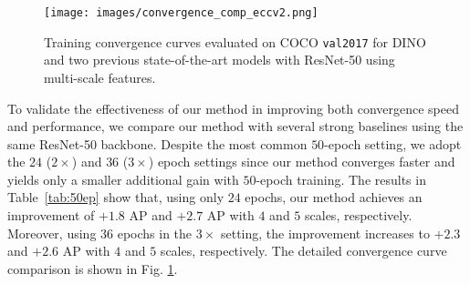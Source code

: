\documentclass[runningheads]{llncs}
\begin{document}
\begin{table}[h]
    \label{tab:50ep}
\end{table} \begin{figure}[h]
\centering
\texttt{[image: images/convergence\_comp\_eccv2.png]}
\caption{Training convergence curves evaluated on COCO \texttt{val2017} for DINO and two previous state-of-the-art models with ResNet-50 using multi-scale features.}
\label{fig:convergence_details}
    \vspace{0.1cm}
\end{figure}
 To validate the effectiveness of our method in improving both convergence speed and performance, we compare our method with several strong baselines using the same ResNet-50 backbone. Despite the most common $50$-epoch setting, we adopt the $24$ ($2\times$) and $36$ ($3\times$) epoch settings since our method converges faster and yields only a smaller additional gain with $50$-epoch training.
The results in Table~\ref{tab:50ep} show that, using only $24$ epochs, our method achieves an improvement of $+1.8$ AP and $+2.7$ AP with $4$ and $5$ scales, respectively. Moreover, using $36$ epochs in the $3\times$ setting, the improvement increases to $+2.3$ and $+2.6$ AP with $4$ and $5$ scales, respectively. The detailed convergence curve comparison is shown in Fig. \ref{fig:convergence_details}.
\\
\end{document}
